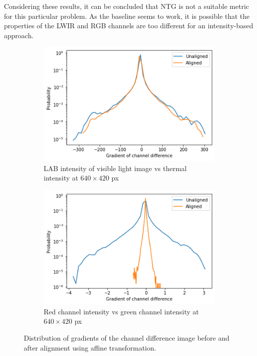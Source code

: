 \documentclass{l4proj}
\begin{document}
Considering these results, it can be concluded that NTG is not a suitable metric for this particular problem. As the baseline seems to work, it is possible that the properties of the LWIR and RGB channels are too different for an intensity-based approach.

\begin{figure}[h]
  \centering
  \begin{subfigure}[h!]{0.45\textwidth}
    \includegraphics[width=\textwidth]{images/registration/gradient_distribution.png}
    \caption{LAB intensity of visible light image vs thermal intensity at $640 \times 420$ px}
    \label{fig:gradient_distribution}
  \end{subfigure}
  \begin{subfigure}[h!]{0.45\textwidth}
    \includegraphics[width=\textwidth]{images/registration/gradient_distribution_red_green.png}
    \caption{Red channel intensity vs green channel intensity at $640 \times 420$ px}
    \label{fig:gradient_distribution_red_green}
  \end{subfigure}
  \caption{Distribution of gradients of the channel difference image before and after alignment using affine transformation.}
\end{figure}
\end{document}
